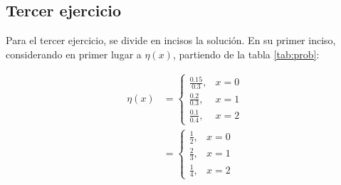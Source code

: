 \subsection*{Tercer ejercicio}

Para el tercer ejercicio, se divide en incisos la solución. En su primer inciso,
considerando en primer lugar a $\eta(x)$, partiendo de la tabla \ref{tab:prob}:

\begin{align}
    \eta(x) &= \begin{cases}
        \frac{0.15}{0.3}, & x=0 \\
        \frac{0.2}{0.3}, & x=1 \\
        \frac{0.1}{0.4}, & x=2
    \end{cases} \\
    &= 
    \begin{cases}
        \frac{1}{2}, & x=0 \\
        \frac{2}{3}, & x=1 \\
        \frac{1}{4}, & x=2
    \end{cases}
\end{align}

